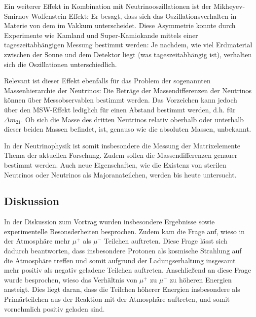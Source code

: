 Ein weiterer Effekt in Kombination mit Neutrinooszillationen ist der Mikheyev-Smirnov-Wolfenstein-Effekt: 
Er besagt, dass sich das Oszillationsverhalten in Materie von dem im Vakkum unterscheidet.
Diese Asymmetrie konnte durch Experimente wie Kamland und Super-Kamiokande mittels einer tageszeitabhängigen Messung bestimmt werden:
Je nachdem, wie viel Erdmaterial zwischen der Sonne und dem Detektor liegt (was tageszeitabhängig ist), verhalten sich die Oszillationen unterschiedlich.

Relevant ist dieser Effekt ebenfalls für das Problem der sogenannten Massenhierarchie der Neutrinos:
Die Beträge der Massendifferenzen der Neutrinos können über Messobservablen bestimmt werden.
Das Vorzeichen kann jedoch über den MSW-Effekt lediglich für einen Abstand bestimmt werden, d.h. für $\Delta m_{21}$. Ob sich die Masse des dritten Neutrinos relativ oberhalb oder unterhalb dieser beiden Massen befindet, ist, genauso wie die absoluten Massen, unbekannt.

In der Neutrinophysik ist somit insbesondere die Messung der Matrixelemente Thema der aktuellen Forschung.
Zudem sollen die Massendifferenzen genauer bestimmt werden.
Auch neue Eigenschaften, wie die Existenz von sterilen Neutrinos oder Neutrinos als Majoranateilchen, werden bis heute untersucht.

\subsection{Diskussion}

In der Diskussion zum Vortrag wurden insbesondere Ergebnisse sowie experimentelle Besonsderheiten besprochen.
Zudem kam die Frage auf, wieso in der Atmosphäre mehr $\mu^+$ als $\mu^-$ Teilchen auftreten.
Diese Frage lässt sich dadurch beantworten, dass insbesondere Protonen als kosmische Strahlung auf die Atmosphäre treffen und somit aufgrund der Ladungserhaltung insgesamt mehr positiv als negativ geladene Teilchen auftreten.
Anschließend an diese Frage wurde besprochen, wieso das Verhältnis von $\mu^+$ zu $\mu^-$ zu höheren Energien ansteigt.
Dies liegt daran, dass die Teilchen höherer Energien insbesondere als Primärteilchen aus der Reaktion mit der Atmosphäre auftreten, und somit vornehmlich positiv geladen sind.